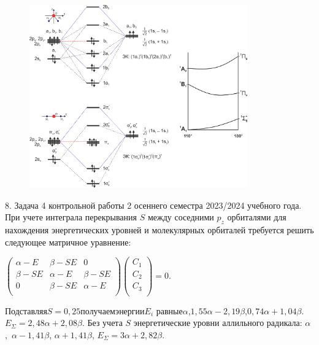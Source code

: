 \begin{figure}[h]
\includegraphics[width=9.4cm]{images/Fig_1_7_8_dec.png}
\centering
\end{figure}
\vspace{-\parskip}
\par
8. Задача 4 контрольной работы 2 осеннего семестра 2023/2024 учебного года. При учете интеграла перекрывания $S$ между соседними $p_z$ орбиталями для нахождения энергетических уровней и молекулярных орбиталей требуется решить следующее матричное уравнение:\par
\vspace{-\parskip}
\vspace{2mm}
\hspace{7mm}
$\begin{pmatrix}
\alpha-E & \beta-SE & 0 \\
\beta-SE & \alpha-E & \beta-SE \\
0 & \beta-SE & \alpha-E \\
\end{pmatrix}
\begin{pmatrix}
C_1 \\
C_2 \\
C_3 \\
\end{pmatrix}=0.$\par
\vspace{-\parskip}
\vspace{2mm}
Подставляя\hspace{\fill}$S=0,25$\hspace{\fill}получаем\hspace{\fill}энергии\hspace{\fill}$E_i$ равные\hspace{\fill}$\alpha$,\hspace{\fill}$1,55\alpha-2,19\beta$,\hspace{\fill}$0,74\alpha+1,04\beta$.\\ $E_{\Sigma}=2,48\alpha+2,08\beta$. Без учета $S$ энергетические уровни аллильного радикала: $\alpha$,~$\alpha-1,41\beta$, $\alpha+1,41\beta$, $E_{\Sigma}=3\alpha+2,82\beta$.\par
